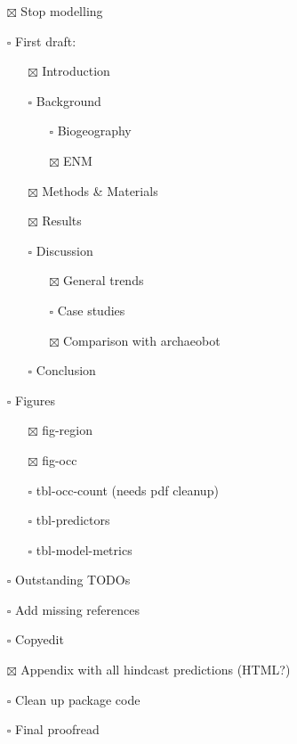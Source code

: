 \documentclass[
  authoryear,
  preprint]{elsarticle}
\providecommand{\tightlist}{%
  \setlength{\itemsep}{0pt}\setlength{\parskip}{0pt}}\usepackage{longtable,booktabs,array}
\begin{document}
\begin{itemize}
\tightlist
\item[$\boxtimes$]
  Stop modelling
\item[$\square$]
  First draft:

  \begin{itemize}
  \tightlist
  \item[$\boxtimes$]
    Introduction
  \item[$\square$]
    Background

    \begin{itemize}
    \tightlist
    \item[$\square$]
      Biogeography
    \item[$\boxtimes$]
      ENM
    \end{itemize}
  \item[$\boxtimes$]
    Methods \& Materials
  \item[$\boxtimes$]
    Results
  \item[$\square$]
    Discussion

    \begin{itemize}
    \tightlist
    \item[$\boxtimes$]
      General trends
    \item[$\square$]
      Case studies
    \item[$\boxtimes$]
      Comparison with archaeobot
    \end{itemize}
  \item[$\square$]
    Conclusion
  \end{itemize}
\item[$\square$]
  Figures

  \begin{itemize}
  \tightlist
  \item[$\boxtimes$]
    fig-region
  \item[$\boxtimes$]
    fig-occ
  \item[$\square$]
    tbl-occ-count (needs pdf cleanup)
  \item[$\square$]
    tbl-predictors
  \item[$\square$]
    tbl-model-metrics
  \end{itemize}
\item[$\square$]
  Outstanding TODOs
\item[$\square$]
  Add missing references
\item[$\square$]
  Copyedit
\item[$\boxtimes$]
  Appendix with all hindcast predictions (HTML?)
\item[$\square$]
  Clean up package code
\item[$\square$]
  Final proofread
\end{itemize}
\end{document}

